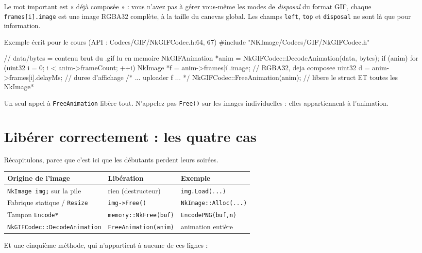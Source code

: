 Le mot important est « déjà composée » : vous n'avez pas à gérer vous-même les
modes de \emph{disposal} du format GIF, chaque \texttt{frames[i].image} est une
image RGBA32 complète, à la taille du canevas global. Les champs
\texttt{left}, \texttt{top} et \texttt{disposal} ne sont là que pour information.

\begin{nkcode}{Exemple écrit pour le cours (API : Codecs/GIF/NkGIFCodec.h:64, 67)}
#include "NKImage/Codecs/GIF/NkGIFCodec.h"

// data/bytes = contenu brut du .gif lu en memoire
NkGIFAnimation *anim = NkGIFCodec::DecodeAnimation(data, bytes);
if (anim) {
    for (uint32 i = 0; i < anim->frameCount; ++i) {
        NkImage *f = anim->frames[i].image;      // RGBA32, deja composee
        uint32   d = anim->frames[i].delayMs;    // duree d'affichage
        /* ... uploader f ... */
    }
    NkGIFCodec::FreeAnimation(anim);   // libere le struct ET toutes les NkImage*
}
\end{nkcode}

Un seul appel à \texttt{FreeAnimation} libère tout. N'appelez pas
\texttt{Free()} sur les images individuelles : elles appartiennent à
l'animation.

\section{Libérer correctement : les quatre cas}

Récapitulons, parce que c'est ici que les débutants perdent leurs soirées.

\begin{center}
\begin{tabular}{@{}lll@{}}
\toprule
\textbf{Origine de l'image} & \textbf{Libération} & \textbf{Exemple} \\
\midrule
\texttt{NkImage img;} sur la pile & rien (destructeur) & \texttt{img.Load(...)} \\
Fabrique statique / \texttt{Resize} & \texttt{img->Free()} & \texttt{NkImage::Alloc(...)} \\
Tampon \texttt{Encode*} & \texttt{memory::NkFree(buf)} & \texttt{EncodePNG(buf,n)} \\
\texttt{NkGIFCodec::DecodeAnimation} & \texttt{FreeAnimation(anim)} & animation entière \\
\bottomrule
\end{tabular}
\end{center}

Et une cinquième méthode, qui n'appartient à aucune de ces lignes :

